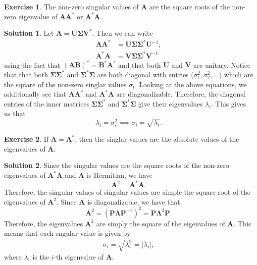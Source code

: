 \documentclass[12pt]{article}
\newcommand{\abs}[1]{ \left| #1 \right| }
\renewcommand{\vec}[1]{\mathbf{#1}}
\theoremstyle{definition}
\newtheorem{exer}{Exercise}
\newtheorem{sol}{Solution}
\theoremstyle{remark}
\begin{document}
\begin{exer}
    The non-zero singular values of $\vec{A}$ are the square roots of the non-zero eigenvalue of $\vec{A}\vec{A}^*$ or $\vec{A}^*\vec{A}$.
\end{exer}
\begin{sol}
    Let $\vec{A} = \vec{U\Sigma V}^*$. Then we can write 
    \begin{align}
        \vec{A A}^* &= \vec{U}\vec{\Sigma}\vec{\Sigma}^*\vec{U}^{-1},\\
        \vec{A}^*\vec{A}  &= \vec{V}\vec{\Sigma}\vec{\Sigma}^*\vec{V}^{-1}
    \end{align}
    using the fact that $(\vec{AB})^* = \vec{B}^*\vec{A}^*$ and that both $\vec{U}$ and $\vec{V}$ are unitary. Notice that that both $\vec{\Sigma}\vec{\Sigma}^*$ and $\vec{\Sigma}^*\vec{\Sigma}$ are both diagonal with entries ($\sigma_1^2,\sigma_2^2, \ldots)$ which are the square of the non-zero singlar values $\sigma_i$. Looking at the above equations, we additionally see that $\vec{A}\vec{A}^*$ and $\vec{A}^*\vec{A}$ are diagonalizable. Therefore, the diagonal entries of the inner matrices $\vec{\Sigma}\vec{\Sigma}^*$ and $\vec{\Sigma}^*\vec{\Sigma}$ give their eigenvalues $\lambda_i$. This gives us that
    \begin{equation}
        \lambda_i = \sigma_i^2 \implies \sigma_i = \sqrt{\lambda_i}.
    \end{equation}
\end{sol}

\begin{exer}
    If $\vec{A}=\vec{A}^*$, then the singlar values are the absolute values of the eigenvalues of $\vec{A}$.
\end{exer}

\begin{sol}
    Since the singular values are the square roots of the non-zero eigenvalues of $\vec{A}^*\vec{A}$ and $\vec{A}$ is Hermitian, we have 
    \begin{equation}
        \vec{A}^2=\vec{A}^*\vec{A}.
    \end{equation}
Therefore, the singular values of singular values are simple the square root of the eigenvalues of $\vec{A}^2$. Since $\vec{A}$ is diagonalizable, we have that
\begin{equation}
    \vec{A}^2 = (\vec{P}\vec{\Lambda}\vec{P}^{-1})^2 = \vec{P}\vec{\Lambda}^2\vec{P}.
\end{equation}
Therefore, the eigenvalues $\vec{A}^2$ are simply the square of the eigenvalues of $\vec{A}$. This means that each sngular value is given by
\begin{equation}
    \sigma_i = \sqrt{ \lambda_i^2 } = \abs{\lambda_i},
\end{equation}
where $\lambda_i$ is the $i$-th eigenvalue of $\vec{A}$.
\end{sol}
\end{document}
